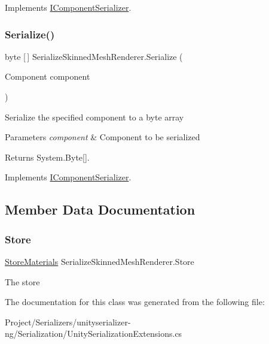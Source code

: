 Implements \hyperlink{interface_i_component_serializer_a4cc366a5c78b33d47a90c209d8fed883}{I\+Component\+Serializer}.

\mbox{\label{class_serialize_skinned_mesh_renderer_a5537c5f2cab4580a75bd8f6ef3ef331d}} 
\subsubsection{\texorpdfstring{Serialize()}{Serialize()}}
{\footnotesize\ttfamily byte \mbox{[}$\,$\mbox{]} Serialize\+Skinned\+Mesh\+Renderer.\+Serialize (\begin{DoxyParamCaption}\item[{Component}]{component }\end{DoxyParamCaption})\hspace{0.3cm}{\ttfamily [inline]}}



Serialize the specified component to a byte array 


\begin{DoxyParams}{Parameters}
{\em component} & Component to be serialized\\
\hline
\end{DoxyParams}
\begin{DoxyReturn}{Returns}
System.\+Byte\mbox{[}\mbox{]}.
\end{DoxyReturn}


Implements \hyperlink{interface_i_component_serializer_ab2aa38005665496b62d6c54b5f0dbd31}{I\+Component\+Serializer}.



\subsection{Member Data Documentation}
\mbox{\label{class_serialize_skinned_mesh_renderer_aea00be7a265b75c63258cfbf9b0b3b79}} 
\subsubsection{\texorpdfstring{Store}{Store}}
{\footnotesize\ttfamily \hyperlink{class_serialization_1_1_store_materials}{Store\+Materials} Serialize\+Skinned\+Mesh\+Renderer.\+Store\hspace{0.3cm}{\ttfamily [static]}}



The store 



The documentation for this class was generated from the following file\+:\begin{DoxyCompactItemize}
\item 
Project/\+Serializers/unityserializer-\/ng/\+Serialization/Unity\+Serialization\+Extensions.\+cs\end{DoxyCompactItemize}
